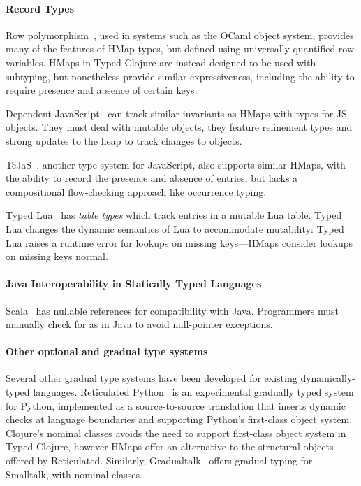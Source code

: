 \documentclass[9pt]{extarticle}
\begin{document}


\paragraph{Record Types} Row polymorphism~\cite{Wand89typeinference,CM91,HP91}, used
in systems such as the OCaml object system, provides many of the
features of HMap types, but defined using universally-quantified row
variables. HMaps in Typed Clojure are instead designed to be used with
subtyping, but nonetheless provide similar expressiveness, including
the ability to require presence and absence of certain keys. 

Dependent JavaScript~\cite{Chugh:2012:DTJ} can track similar
invariants as HMaps with types for JS objects. They must deal with
mutable objects, they feature refinement types and strong updates to
the heap to track changes to objects.

TeJaS~\cite{TeJaS}, another type system for JavaScript,
also supports similar HMaps, with the ability to
record the presence and absence of entries, but lacks a compositional
flow-checking approach like occurrence typing.

Typed Lua~\cite{Maidl:2014:TLO} has \emph{table types} which track
entries in a mutable Lua table.  Typed Lua changes the dynamic
semantics of Lua to accommodate mutability: Typed Lua raises a runtime
error for lookups on missing keys---HMaps consider lookups on missing
keys normal.

\paragraph{Java Interoperability in Statically Typed Languages}
Scala~\cite{OCD+} has nullable references for compatibility with Java.
Programmers must manually check for
 as in Java to avoid null-pointer exceptions. 


\paragraph{Other optional and gradual type systems}
Several other gradual type
systems have been developed for existing
dynamically-typed languages.  Reticulated Python~\cite{Vitousek14} is
an experimental gradually typed system for Python, implemented as a
source-to-source translation that inserts dynamic checks at language
boundaries and supporting Python's first-class object system. 
Clojure's nominal classes avoids the need to support
first-class object system in Typed Clojure, however HMaps offer an alternative to
the structural objects offered by Reticulated. Similarly,
Gradualtalk~\cite{gradualtalk} offers gradual typing for Smalltalk,
with nominal classes.
\end{document}
